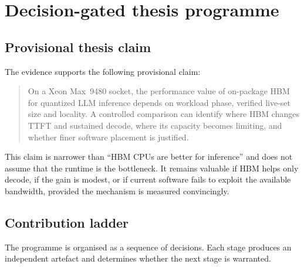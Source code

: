 \section{Decision-gated thesis programme}
\label{sec:programme}

\subsection{Provisional thesis claim}

The evidence supports the following provisional claim:

\begin{quote}
On a Xeon Max~9480 socket, the performance value of on-package HBM for
quantized LLM inference depends on workload phase, verified live-set
size and locality.  A controlled comparison can identify where HBM
changes TTFT and sustained decode, where its capacity becomes limiting,
and whether finer software placement is justified.
\end{quote}

This claim is narrower than ``HBM CPUs are better for inference'' and
does not assume that the runtime is the bottleneck.  It remains valuable
if HBM helps only decode, if the gain is modest, or if current software
fails to exploit the available bandwidth, provided the mechanism is
measured convincingly.

\subsection{Contribution ladder}

The programme is organised as a sequence of decisions.  Each stage
produces an independent artefact and determines whether the next stage
is warranted.

